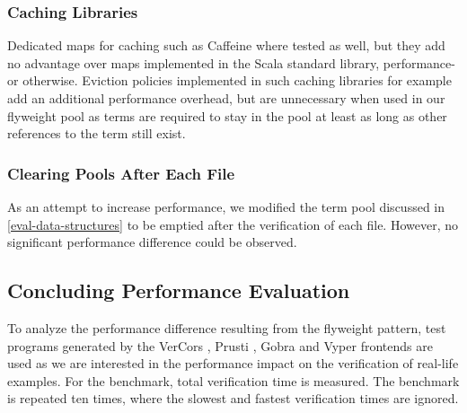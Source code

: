 \documentclass[11pt]{article}
\begin{document}
    \subsubsection{Caching Libraries}

    Dedicated maps for caching such as Caffeine \cite{caffeine} where tested as well,
    but they add no advantage over maps
    implemented in the Scala standard library, performance- or otherwise.
    Eviction policies implemented in such caching libraries for example
    add an additional performance overhead, but are unnecessary when used
    in our flyweight pool as terms are required to stay in the pool at least as long
    as other references to the term still exist. 

    \subsubsection{Clearing Pools After Each File}

    As an attempt to increase performance, we modified
    the term pool discussed in \ref{eval-data-structures} to be emptied
    after the verification of each file. However, no significant
    performance difference could be observed.



    

    \subsection{Concluding Performance Evaluation} \label{eval-conclusion}

    To analyze the performance difference resulting
    from the flyweight pattern, test programs generated by the VerCors \cite{vercors},
    Prusti \cite{prusti}, Gobra \cite{gobra} and Vyper \cite{vyper} frontends are used
    as we are interested in the performance impact on the verification of real-life examples.
    For the benchmark, total verification time  is measured.
    The benchmark is repeated ten times, where the
    slowest and fastest verification times are ignored.
    
\end{document}
